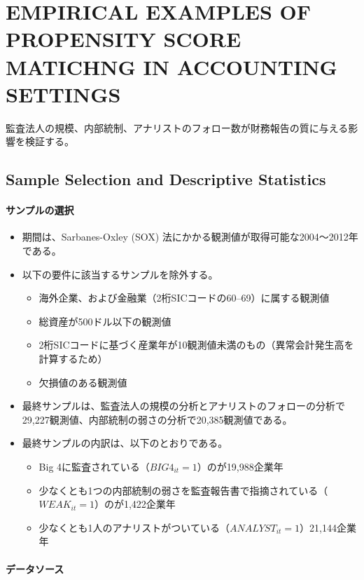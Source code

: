 \section{EMPIRICAL EXAMPLES OF PROPENSITY SCORE MATICHNG IN ACCOUNTING SETTINGS}
監査法人の規模、内部統制、アナリストのフォロー数が財務報告の質に与える影響を検証する。

\subsection*{Sample Selection and Descriptive Statistics}

\paragraph{サンプルの選択}

\begin{itemize}
 \item 期間は、Sarbanes-Oxley (SOX) 法にかかる観測値が取得可能な2004〜2012年である。
 \item 以下の要件に該当するサンプルを除外する。
   \begin{itemize}
    \item 海外企業、および金融業（2桁SICコードの60–69）に属する観測値
    \item 総資産が500ドル以下の観測値
    \item 2桁SICコードに基づく産業年が10観測値未満のもの（異常会計発生高を計算するため）
    \item 欠損値のある観測値
   \end{itemize}
 \item 最終サンプルは、監査法人の規模の分析とアナリストのフォローの分析で29,227観測値、内部統制の弱さの分析で20,385観測値である。
 \item 最終サンプルの内訳は、以下のとおりである。
    \begin{itemize}
    \item Big 4に監査されている（$\mathit{BIG}4_{it}=1$）のが19,988企業年
    \item 少なくとも1つの内部統制の弱さを監査報告書で指摘されている（$\mathit{WEAK}_{it}=1$）のが1,422企業年
    \item 少なくとも1人のアナリストがついている（$\mathit{ANALYST}_{it}=1$）21,144企業年
   \end{itemize}
\end{itemize}

\paragraph{データソース}

